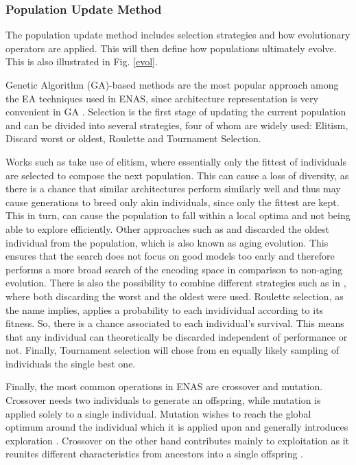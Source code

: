 \documentclass[10pt,        %
               a4paper,     %
               journal,     %
               ]{IEEEtran}
\begin{document}
\subsubsection{Population Update Method}
\label{pop}
The population update method includes selection strategies and how evolutionary operators are applied. This will then
define how populations ultimately evolve. This is also illustrated in Fig. \ref{evol}.

Genetic Algorithm (GA)-based methods are the most popular approach among the EA techniques used in ENAS, since architecture representation is
very convenient in GA \cite{liu2021survey}. Selection is the first stage of updating the current population and can
be divided into several strategies, four of whom are widely used: Elitism, Discard worst or oldest, Roulette and
Tournament Selection.

Works such as \cite{elsken2017simple} take use of elitism, where essentially only the fittest of individuals are selected to
compose the next population. This can cause a loss of diversity, as there is a chance that similar architectures perform
similarly well and thus may cause generations to breed only akin individuals, since only the fittest are kept. This in turn,
can cause the population to fall within a local optima and not being able to explore efficiently.
Other approaches such as \cite{pmlr-v70-real17a} and \cite{zhang2019identify} discarded the oldest individual from the population,
which is also known as aging evolution. This ensures that the search does not focus on good models too early and therefore
performs a more broad search of the encoding space in comparison to non-aging evolution. There is also the possibility to
combine different strategies such as in \cite{zhu2019eena}, where both discarding the worst and the oldest were used.
Roulette selection, as the name implies, applies a probability to each invidividual according to its fitness. So, there is
a chance associated to each individual's survival. This means that any individual can theoretically be discarded independent
of performance or not. Finally, Tournament selection will chose from en equally likely sampling of individuals the single best one.

Finally, the most common operations in ENAS are crossover and mutation. Crossover needs two individuals to generate
an offspring, while mutation is applied solely to a single individual. Mutation wishes to reach the global optimum around
the individual which it is applied upon and generally introduces exploration \cite{liu2021survey}. Crossover on the other hand
contributes mainly to exploitation as it reunites different characteristics from ancestors into a single offspring \cite{liu2021survey}.
\end{document}
